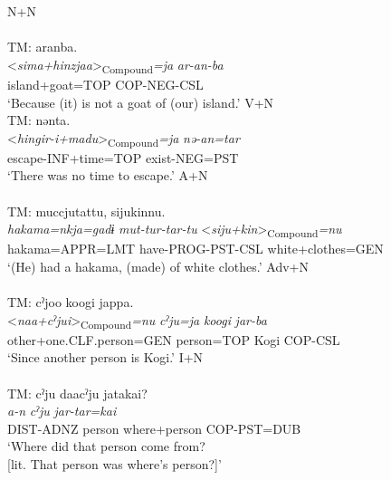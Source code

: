\ea \label{ex:4.24}
\ea N+N\hfill\relax[PF: 090222\_00.txt]\\\label{ex:4.24a}
\\
 {TM:}  {aranba.}\\
  {<\textit{sima+hinzjaa}>\textsubscript{Compound}\textit{=ja}} {\itshape ar-an-ba}\\
  {island+goat=TOP} {COP-NEG-CSL}\\
 \glt{} ‘Because (it) is not a goat of (our) island.’
\ex V+N\hfill\relax[El: 120926]\\\label{ex:4.24b}
 {TM:}  {nənta.}\\
  {<\textit{hingir-i+madu}>\textsubscript{Compound}\textit{=ja}} {\itshape nə-an=tar}\\
  {escape-INF+time=TOP} {exist-NEG=PST}\\
  \glt{} ‘There was no time to escape.’
{\smallex\ex A+N\hfill\relax[Co: 120415\_00.txt]\\\label{ex:4.24c}
 \\
 {TM:}  {muccjutattu,} {sijukinnu.}\\
  {\itshape hakama=nkja=gadɨ} {\itshape mut-tur-tar-tu} {<\textit{siju+kin}>\textsubscript{Compound}\textit{=nu}}\\
  {hakama=APPR=LMT} {have-PROG-PST-CSL} {white+clothes=GEN}\\
  \glt{} ‘(He) had a hakama, (made) of white clothes.’}
\ex Adv+N\hfill\relax[Co: 120415\_00.txt]\\\label{ex:4.24d}
 \\
 {TM:}  {cˀjoo} {koogi} {jappa.}\\
  {<\textit{naa+cˀjui}>\textsubscript{Compound}\textit{=nu}} {\itshape cˀju=ja} {\itshape koogi} {\itshape jar-ba}\\
  {other+one.CLF.person=GEN} {person=TOP} {Kogi} {COP-CSL}\\
  \glt{} ‘Since another person is Kogi.’
\ex I+N\hfill\relax[Co: 120415\_01.txt]\\\label{ex:4.24e}
 \\
 {TM:}  {cˀju} {daacˀju} {jatakai?}\\
  {\itshape a-n} {\itshape cˀju}  {\itshape jar-tar=kai}\\
  {DIST-ADNZ} {person} {where+person} {COP-PST=DUB}\\
  \glt{} ‘Where did that person come from?\\
       [lit. That person was where’s person?]’
\z
\z

